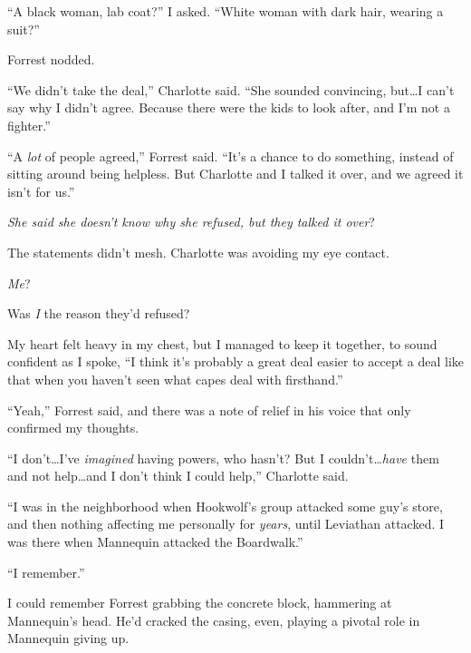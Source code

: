 ``A black woman, lab coat?'' I asked.  ``White woman with dark hair, wearing a suit?''



Forrest nodded.



``We didn't take the deal,'' Charlotte said.  ``She sounded convincing, but\ldots I can't say why I didn't agree.  Because there were the kids to look after, and I'm not a fighter.''



``A \emph{lot} of people agreed,'' Forrest said.  ``It's a chance to do something, instead of sitting around being helpless.  But Charlotte and I talked it over, and we agreed it isn't for us.''



\emph{She said she doesn't know why she refused, but they talked it over}?



The statements didn't mesh.  Charlotte was avoiding my eye contact.



\emph{Me}?



Was \emph{I} the reason they'd refused?



My heart felt heavy in my chest, but I managed to keep it together, to sound confident as I spoke, ``I think it's probably a great deal easier to accept a deal like that when you haven't seen what capes deal with firsthand.''



``Yeah,'' Forrest said, and there was a note of relief in his voice that only confirmed my thoughts.



``I don't\ldots I've \emph{imagined} having powers, who hasn't?  But I couldn't\ldots \emph{have} them and not help\ldots and I don't think I could help,'' Charlotte said.



``I was in the neighborhood when Hookwolf's group attacked some guy's store, and then nothing affecting me personally for \emph{years}, until Leviathan attacked.  I was there when Mannequin attacked the Boardwalk.''



``I remember.''



I could remember Forrest grabbing the concrete block, hammering at Mannequin's head.  He'd cracked the casing, even, playing a pivotal role in Mannequin giving up.




